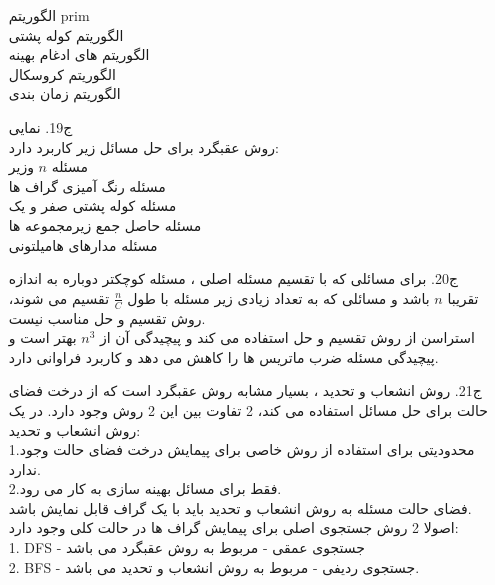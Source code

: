 \documentclass[a4paper,11pt]{article}
\begin{document}
\begin{enumerate}
الگوریتم prim\\
الگوریتم کوله پشتی\\
الگوریتم های ادغام بهینه\\
الگوریتم کروسکال\\
الگوریتم زمان بندی
	\item [ج19.]
نمایی\\
روش عقبگرد برای حل مسائل زیر کاربرد دارد:\\
مسئله $n$ وزیر\\
مسئله رنگ آمیزی گراف ها\\
مسئله کوله پشتی صفر و یک\\
مسئله حاصل جمع زیرمجموعه ها\\
مسئله مدارهای هامیلتونی
\newpage
	\item [ج20.]
برای مسائلی که با تقسیم مسئله اصلی ، مسئله کوچکتر دوباره به اندازه تقریبا $n$ باشد و مسائلی که به تعداد زیادی زیر مسئله با طول $\frac{n}{C}$ تقسیم می شوند، روش تقسیم و حل مناسب نیست. \\
استراسن از روش تقسیم و حل استفاده می کند و پیچیدگی آن از $n^3$ بهتر است و پیچیدگی مسئله ضرب ماتریس ها را کاهش می دهد و کاربرد فراوانی دارد.
	\item [ج21.]
روش انشعاب و تحدید ، بسیار مشابه روش عقبگرد است که از درخت فضای حالت برای حل مسائل استفاده می کند، 2 تفاوت بین این 2 روش وجود دارد. در یک روش انشعاب و تحدید:\\
1.محدودیتی برای استفاده از روش خاصی برای پیمایش درخت فضای حالت وجود ندارد.\\
2.فقط برای مسائل بهینه سازی به کار می رود.\\
فضای حالت مسئله به روش انشعاب و تحدید باید با یک گراف قابل نمایش باشد.\\
اصولا 2 روش جستجوی اصلی برای پیمایش گراف ها در حالت کلی وجود دارد:\\
1. DFS - جستجوی عمقی - مربوط به روش عقبگرد می باشد\\
2. BFS - جستجوی ردیفی - مربوط به روش انشعاب و تحدید می باشد.\\


\end{enumerate}
\end{document}
